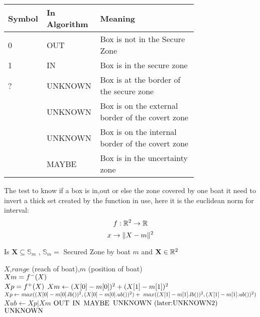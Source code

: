 \begin{center}
\begin{tabular}{|m{0.10\linewidth}|m{0.15\linewidth}|m{0.5\linewidth}|}
\hline
 Symbol & In Algorithm  & Meaning  \\ \hline
 0 & OUT & Box is not in the Secure Zone  \\ \hline
 1 & IN & Box is in the secure zone \\ \hline
 ? & UNKNOWN & Box is at the border of the secure zone  \\ \hline
[0,?]& UNKNOWN  & Box is on the external border of the covert zone \\ \hline
[?,1]& UNKNOWN  & Box is on the internal border of the covert zone\\ \hline
[0,1]& MAYBE  & Box is in the uncertainty zone\\ \hline
   
\end{tabular}
\end{center}

The test to know if a box is in,out or else the zone covered by one boat it need to invert a thick set created by the function in use, here it is the euclidean norm for interval:
 \[ f : \mathbb{R^{\textnormal{\ensuremath{2}}}} \rightarrow \mathbb{R} \]
   \[x \rightarrow \|X-m\|^{\textnormal{\ensuremath{2}}}\]
   
 


\begin{algorithm}[H]
\caption{Is $\mathbf{X} \subseteq \mathbb{S}_m$ , $\mathbb{S}_m =$ Secured Zone by boat $m$ and $\mathbf{X} \in \mathbb{R^{\textnormal{\ensuremath{2}}}}$ }
\label{alg:one_boat_alg}
\begin{algorithmic}[1]
\REQUIRE $X$,$range $ (reach of boat),$m$ (position of boat)\\
  $Xm = f^{\textnormal{\ensuremath{-}}}(X) $\\
  $Xp = f^{\textnormal{\ensuremath{+}}}(X) $
\STATE $Xm \leftarrow (X[0]-m[0])^{\textnormal{\ensuremath{2}}}+(X[1]-m[1])^{\textnormal{\ensuremath{2}}}$
\STATE $Xp \leftarrow max((X[0]-m[0].lb())^{\textnormal{\ensuremath{2}}},(X[0]-m[0].ub())^{\textnormal{\ensuremath{2}}}) + \
                  max((X[1]-m[1].lb())^{\textnormal{\ensuremath{2}}},(X[1]-m[1].ub())^{\textnormal{\ensuremath{2}}})$
\STATE $Xub \leftarrow Xp | Xm$
\RETURN $\textnormal{OUT}$
\RETURN $\textnormal{IN}$
\ELSE
\IF{ $\textnormal{range}^{\textnormal{\ensuremath{2}}} - Xp.ub() < \textnormal{0}] $}
\RETURN $\textnormal{MAYBE}$ \label{op1}
\ELSE
\RETURN $\textnormal{UNKNOWN (later:UNKNOWN2)}$ \label{op0}
\ENDIF
\ELSE
\RETURN $\textnormal{UNKNOWN}$
\ENDIF
\ENDIF
\end{algorithmic}
\end{algorithm}

